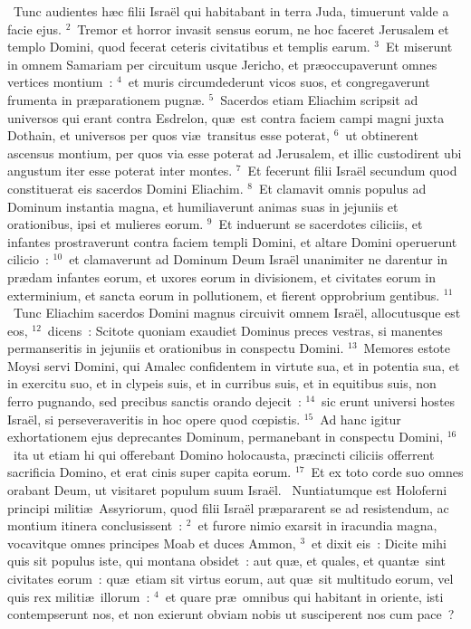 ~Tunc audientes h\ae c filii Isra\"el qui habitabant in terra Juda, timuerunt valde a facie ejus.
${}^{2}$~Tremor et horror invasit sensus eorum, ne hoc faceret Jerusalem et templo Domini, quod fecerat ceteris civitatibus et templis earum.
${}^{3}$~Et miserunt in omnem Samariam per circuitum usque Jericho, et pr\ae occupaverunt omnes vertices montium~:
${}^{4}$~et muris circumdederunt vicos suos, et congregaverunt frumenta in pr\ae parationem pugn\ae .
${}^{5}$~Sacerdos etiam Eliachim scripsit ad universos qui erant contra Esdrelon, qu\ae\ est contra faciem campi magni juxta Dothain, et universos per quos vi\ae\ transitus esse poterat,
${}^{6}$~ut obtinerent ascensus montium, per quos via esse poterat ad Jerusalem, et illic custodirent ubi angustum iter esse poterat inter montes.
${}^{7}$~Et fecerunt filii Isra\"el secundum quod constituerat eis sacerdos Domini Eliachim.
${}^{8}$~Et clamavit omnis populus ad Dominum instantia magna, et humiliaverunt animas suas in jejuniis et orationibus, ipsi et mulieres eorum.
${}^{9}$~Et induerunt se sacerdotes ciliciis, et infantes prostraverunt contra faciem templi Domini, et altare Domini operuerunt cilicio~:
${}^{10}$~et clamaverunt ad Dominum Deum Isra\"el unanimiter ne darentur in pr\ae dam infantes eorum, et uxores eorum in divisionem, et civitates eorum in exterminium, et sancta eorum in pollutionem, et fierent opprobrium gentibus.
${}^{11}$~Tunc Eliachim sacerdos Domini magnus circuivit omnem Isra\"el, allocutusque est eos,
${}^{12}$~dicens~: Scitote quoniam exaudiet Dominus preces vestras, si manentes permanseritis in jejuniis et orationibus in conspectu Domini.
${}^{13}$~Memores estote Moysi servi Domini, qui Amalec confidentem in virtute sua, et in potentia sua, et in exercitu suo, et in clypeis suis, et in curribus suis, et in equitibus suis, non ferro pugnando, sed precibus sanctis orando dejecit~:
${}^{14}$~sic erunt universi hostes Isra\"el, si perseveraveritis in hoc opere quod cœpistis.
${}^{15}$~Ad hanc igitur exhortationem ejus deprecantes Dominum, permanebant in conspectu Domini,
${}^{16}$~ita ut etiam hi qui offerebant Domino holocausta, pr\ae cincti ciliciis offerrent sacrificia Domino, et erat cinis super capita eorum.
${}^{17}$~Et ex toto corde suo omnes orabant Deum, ut visitaret populum suum Isra\"el.
~Nuntiatumque est Holoferni principi militi\ae\ Assyriorum, quod filii Isra\"el pr\ae pararent se ad resistendum, ac montium itinera conclusissent~:
${}^{2}$~et furore nimio exarsit in iracundia magna, vocavitque omnes principes Moab et duces Ammon,
${}^{3}$~et dixit eis~: Dicite mihi quis sit populus iste, qui montana obsidet~: aut qu\ae , et quales, et quant\ae\ sint civitates eorum~: qu\ae\ etiam sit virtus eorum, aut qu\ae\ sit multitudo eorum, vel quis rex militi\ae\ illorum~:
${}^{4}$~et quare pr\ae\ omnibus qui habitant in oriente, isti contempserunt nos, et non exierunt obviam nobis ut susciperent nos cum pace~?


